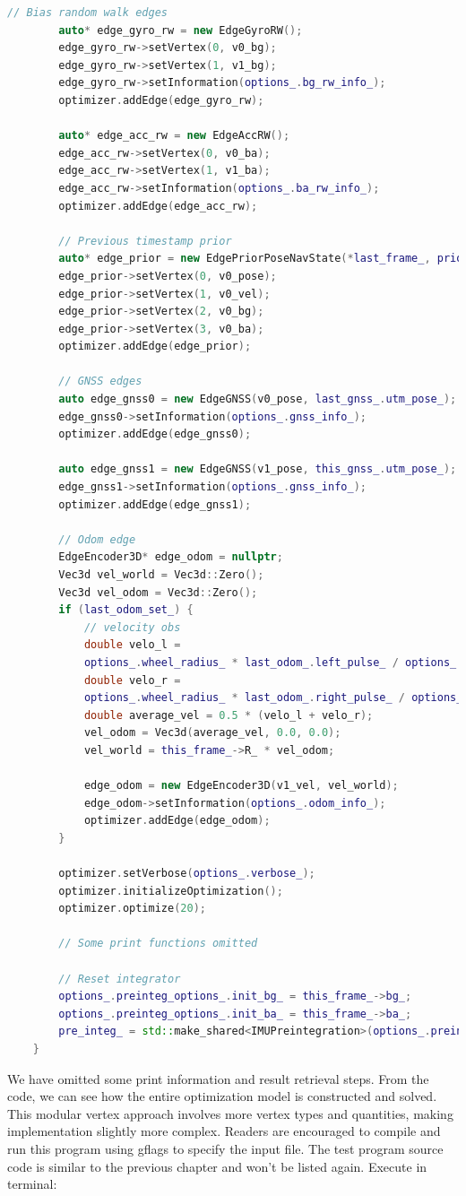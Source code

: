 \begin{lstlisting}[language=c++,caption=src/ch4/gins\_pre\_integ.cc]
		// Bias random walk edges
		auto* edge_gyro_rw = new EdgeGyroRW();
		edge_gyro_rw->setVertex(0, v0_bg);
		edge_gyro_rw->setVertex(1, v1_bg);
		edge_gyro_rw->setInformation(options_.bg_rw_info_);
		optimizer.addEdge(edge_gyro_rw);
		
		auto* edge_acc_rw = new EdgeAccRW();
		edge_acc_rw->setVertex(0, v0_ba);
		edge_acc_rw->setVertex(1, v1_ba);
		edge_acc_rw->setInformation(options_.ba_rw_info_);
		optimizer.addEdge(edge_acc_rw);
		
		// Previous timestamp prior
		auto* edge_prior = new EdgePriorPoseNavState(*last_frame_, prior_info_);
		edge_prior->setVertex(0, v0_pose);
		edge_prior->setVertex(1, v0_vel);
		edge_prior->setVertex(2, v0_bg);
		edge_prior->setVertex(3, v0_ba);
		optimizer.addEdge(edge_prior);
		
		// GNSS edges
		auto edge_gnss0 = new EdgeGNSS(v0_pose, last_gnss_.utm_pose_);
		edge_gnss0->setInformation(options_.gnss_info_);
		optimizer.addEdge(edge_gnss0);
		
		auto edge_gnss1 = new EdgeGNSS(v1_pose, this_gnss_.utm_pose_);
		edge_gnss1->setInformation(options_.gnss_info_);
		optimizer.addEdge(edge_gnss1);
		
		// Odom edge
		EdgeEncoder3D* edge_odom = nullptr;
		Vec3d vel_world = Vec3d::Zero();
		Vec3d vel_odom = Vec3d::Zero();
		if (last_odom_set_) {
			// velocity obs
			double velo_l =
			options_.wheel_radius_ * last_odom_.left_pulse_ / options_.circle_pulse_ * 2 * M_PI / options_.odom_span_;
			double velo_r =
			options_.wheel_radius_ * last_odom_.right_pulse_ / options_.circle_pulse_ * 2 * M_PI / options_.odom_span_;
			double average_vel = 0.5 * (velo_l + velo_r);
			vel_odom = Vec3d(average_vel, 0.0, 0.0);
			vel_world = this_frame_->R_ * vel_odom;
			
			edge_odom = new EdgeEncoder3D(v1_vel, vel_world);
			edge_odom->setInformation(options_.odom_info_);
			optimizer.addEdge(edge_odom);
		}
		
		optimizer.setVerbose(options_.verbose_);
		optimizer.initializeOptimization();
		optimizer.optimize(20);
		
		// Some print functions omitted
		
		// Reset integrator
		options_.preinteg_options_.init_bg_ = this_frame_->bg_;
		options_.preinteg_options_.init_ba_ = this_frame_->ba_;
		pre_integ_ = std::make_shared<IMUPreintegration>(options_.preinteg_options_);
	}
\end{lstlisting}

We have omitted some print information and result retrieval steps. From the code, we can see how the entire optimization model is constructed and solved. This modular vertex approach involves more vertex types and quantities, making implementation slightly more complex. Readers are encouraged to compile and run this program using gflags to specify the input file. The test program source code is similar to the previous chapter and won't be listed again. Execute in terminal:

